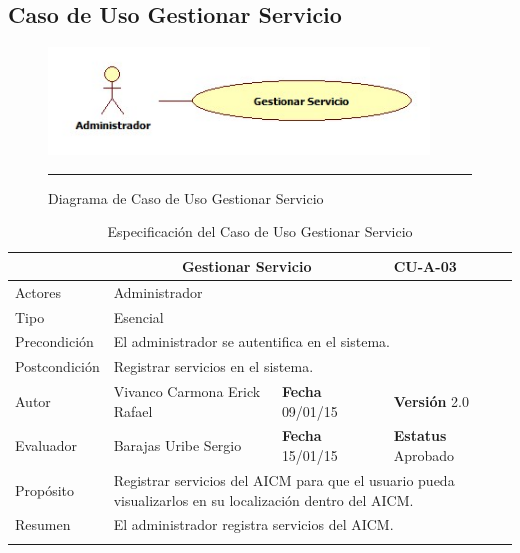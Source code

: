 \subsection{Caso de Uso Gestionar Servicio}

\begin{figure}[htbp]
	\centering
		\includegraphics[width=0.9\textwidth]{Figuras/GestionarServicio.jpg}
		\rule{30em}{0.5pt}
	\caption[Diagrama de Caso de Uso Gestionar Servicio]{Diagrama de Caso de Uso Gestionar Servicio}
	\label{fig:cuGestionarServicio}
\end{figure}

\begin{longtable}{|p{2.5cm}|p{6.4cm}|p{2cm}|p{2cm}|}
	\hline
		\rowcolor[RGB]{51,153,255}{Caso de Uso}&\multicolumn{2}{c}{Gestionar Servicio}&{\textbf{CU-A-03}}\\
	\hline
		{Actores}&\multicolumn{3}{p{11.2cm}|}{Administrador}\\
	\hline
		{Tipo}&\multicolumn{3}{p{11.2cm}|}{Esencial}\\
	\hline
		{Precondición}&\multicolumn{3}{p{11.2cm}|}{El administrador se autentifica en el sistema.}\\
	\hline
		{Postcondición}&\multicolumn{3}{p{11.2cm}|}{Registrar servicios en el sistema.}\\
	\hline
		{Autor}&{Vivanco Carmona Erick Rafael}&{\textbf{Fecha} 09/01/15}&{\textbf{Versión} 2.0}\\
			\hline
		{Evaluador}&{Barajas Uribe Sergio}&{\textbf{Fecha} 15/01/15}&{\textbf{Estatus} Aprobado}\\
	\hline
		{Propósito}&\multicolumn{3}{p{11.2cm}|}{Registrar servicios del AICM para que el usuario pueda visualizarlos en su localización dentro del AICM.}\\
	\hline
		{Resumen}&\multicolumn{3}{p{11.2cm}|}{El administrador registra servicios del AICM.}\\	
	\hline
	\caption[Especificación del Caso de Uso Gestionar Servicio]{Especificación del Caso de Uso Gestionar Servicio}
    	\label{tab:cuGestionarServicio}
\end{longtable}


